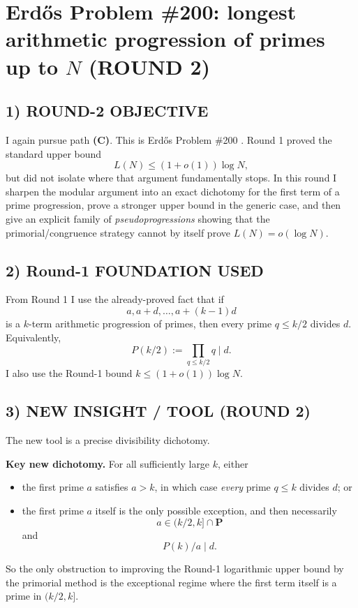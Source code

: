 \section{Erd\H{o}s Problem \#200: longest arithmetic progression of primes up to $N$ (ROUND 2)}

\subsection*{1) ROUND-2 OBJECTIVE}
I again pursue path \textbf{(C)}.  This is Erd\H{o}s Problem \#200 \cite{Bloom200}.  Round 1 proved the standard upper bound
\[
L(N)\le (1+o(1))\log N,
\]
but did not isolate where that argument fundamentally stops.  In this round I sharpen the modular argument into an exact dichotomy for the first term of a prime progression, prove a stronger upper bound in the generic case, and then give an explicit family of \emph{pseudoprogressions} showing that the primorial/congruence strategy cannot by itself prove $L(N)=o(\log N)$.

\subsection*{2) Round-1 FOUNDATION USED}
From Round 1 I use the already-proved fact that if
\[
a,a+d,\dots,a+(k-1)d
\]
is a $k$-term arithmetic progression of primes, then every prime $q\le k/2$ divides $d$.  Equivalently,
\[
P(k/2):=\prod_{q\le k/2} q \mid d.
\]
I also use the Round-1 bound $k\le (1+o(1))\log N$.

\subsection*{3) NEW INSIGHT / TOOL (ROUND 2)}
The new tool is a precise divisibility dichotomy.

\medskip
\noindent\textbf{Key new dichotomy.}
For all sufficiently large $k$, either
\begin{itemize}
\item the first prime $a$ satisfies $a>k$, in which case \emph{every} prime $q\le k$ divides $d$; or
\item the first prime $a$ itself is the only possible exception, and then necessarily
\[
a\in (k/2,k]\cap \mathbf P
\]
and
\[
P(k)/a\mid d.
\]
\end{itemize}
So the only obstruction to improving the Round-1 logarithmic upper bound by the primorial method is the exceptional regime where the first term itself is a prime in $(k/2,k]$.

